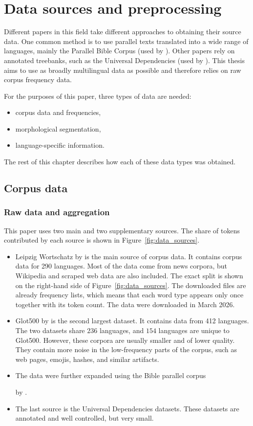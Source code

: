 \chapter{Data sources and preprocessing}

Different papers in this field take different approaches to obtaining their source data. One common method is to use parallel texts translated into a wide range of languages, mainly the Parallel Bible Corpus (used by \textcite{Ehret2023}). Other papers rely on annotated treebanks, such as the Universal Dependencies (used by \textcite{Coltekin2022}). This thesis aims to use as broadly multilingual data as possible and therefore relies on raw corpus frequency data.

For the purposes of this paper, three types of data are needed:
\begin{itemize}
    \item corpus data and frequencies,
    \item morphological segmentation,
    \item language-specific information.
\end{itemize}
The rest of this chapter describes how each of these data types was obtained.

\section{Corpus data}
\subsection{Raw data and aggregation}
This paper uses two main and two supplementary sources. The share of tokens contributed by each source is shown in Figure~\ref{fig:data_sources}.
\begin{itemize}

    \item Leipzig Wortschatz by \textcite{Leipzig} is the main source of corpus data. It contains corpus data for 290 languages. Most of the data come from news corpora, but Wikipedia and scraped web data are also included. The exact split is shown on the right-hand side of Figure~\ref{fig:data_sources}. The downloaded files are already frequency lists, which means that each word type appears only once together with its token count. The data were downloaded in March 2026.
    \item Glot500 by \textcite{glot500} is the second largest dataset. It contains data from 412 languages. The two datasets share $236$ languages, and $154$ languages are unique to Glot500. However, these corpora are usually smaller and of lower quality. They contain more noise in the low-frequency parts of the corpus, such as web pages, emojis, hashes, and similar artifacts.
    \item The data were further expanded using the Bible parallel corpus
    
    by \textcite{BibleCorpus}.
    \item The last source is the Universal Dependencies datasets. These datasets are annotated and well controlled, but very small.
\end{itemize}

